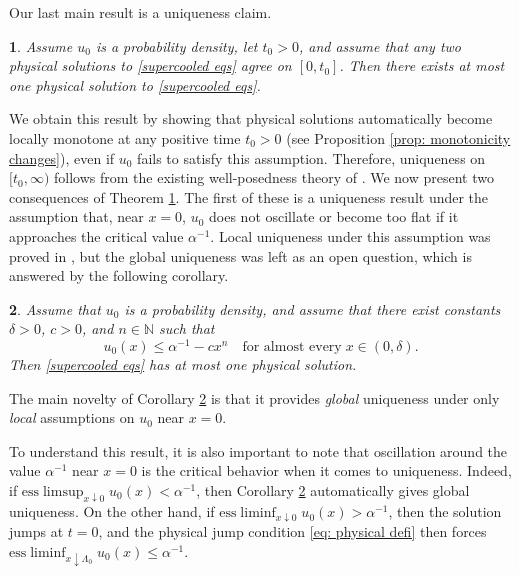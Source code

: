 \documentclass{article}
\numberwithin{equation}{section}
\numberwithin{figure}{section}
\theoremstyle{plain}
\newtheorem{thm}{\protect\theoremname}[section]
\theoremstyle{plain}
\theoremstyle{plain}
\newtheorem{cor}[thm]{\protect\corollaryname}
\theoremstyle{plain}
\theoremstyle{definition}
\theoremstyle{remark}
\providecommand{\corollaryname}{Corollary}
\providecommand{\theoremname}{Theorem}
\begin{document}
Our last main result is a uniqueness claim.
\begin{thm} \label{thm: local to global uniqueness}
    Assume $u_0$ is a probability density, let $t_0>0$, and assume that any two physical solutions to \eqref{supercooled eqs} agree on $[0,t_0]$. Then there exists at most one physical solution to \eqref{supercooled eqs}.
\end{thm}
We obtain this result by showing that physical solutions automatically become locally monotone at any positive time $t_0>0$ (see Proposition \ref{prop: monotonicity changes}), even if $u_0$ fails to satisfy this assumption. Therefore, uniqueness on $[t_0,\infty)$ follows from the existing well-posedness theory of \cite[Thm. 1.1]{delarue}. We now present two consequences of Theorem  \ref{thm: local to global uniqueness}. The first of these is a uniqueness result under the assumption that, near $x=0$, $u_0$ does not oscillate or become too flat if it approaches the critical value $\alpha^{-1}$.  Local uniqueness under this assumption was proved in \cite[Thm. 3.1]{LedSoj}, but the global uniqueness was left as an open question, which is answered by the following corollary.
\begin{cor} \label{cor: unique xn} Assume that $u_0$ is a probability density, and assume that there exist constants $\delta>0$, $c>0$, and $n\in \mathbb{N}$ such that 
\[u_0(x)\leq \alpha^{-1} -c x^n \quad \text{for almost every}  \; x\in (0,\delta).\]
Then \eqref{supercooled eqs} has at most one physical solution.
\end{cor}
The main novelty of Corollary \ref{cor: unique xn} is that it provides {\it global} uniqueness under only {\it local} assumptions on $u_0$ near $x=0$.

To understand this result, it is also important to note that oscillation around the value $\alpha^{-1}$ near $x=0$ is the critical behavior when it comes to uniqueness. Indeed, if $\text{ess}\limsup_{x\downarrow 0}u_0(x)<\alpha^{-1}$, then Corollary \ref{cor: unique xn} automatically gives global uniqueness. On the other hand, if $\text{ess}\liminf_{x\downarrow 0}u_0(x)>\alpha^{-1}$, then the solution jumps at $t=0$, and the physical jump condition \eqref{eq: physical defi} then forces $\text{ess}\liminf_{x\downarrow\Lambda_{0}}u_0(x)\leq\alpha^{-1}$.
\end{document}
